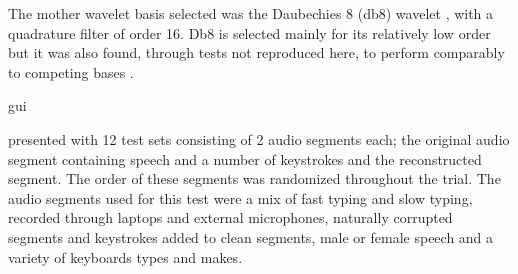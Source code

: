 The mother wavelet basis selected was the Daubechies 8 (db8) wavelet \cite{Daubechies1992}, with a quadrature filter of order 16. Db8 is selected mainly for its relatively low order but it was also found, through tests not reproduced here, to perform comparably to competing bases \DIFaddbegin {}\DIFaddend .

\DIFdelbegin {}\DIFdelend \DIFaddbegin \label{corrections:subjects}\gls{gui} 

\DIFaddend presented with 12 test sets consisting of 2 audio segments each; the original audio segment containing speech and a number of keystrokes and the reconstructed segment. The order of these segments was randomized throughout the trial. The audio segments used for this test were a mix of fast typing and slow typing, recorded through laptops and external microphones, naturally corrupted segments and keystrokes added to clean segments, male or female speech and a variety of keyboards types and makes.

